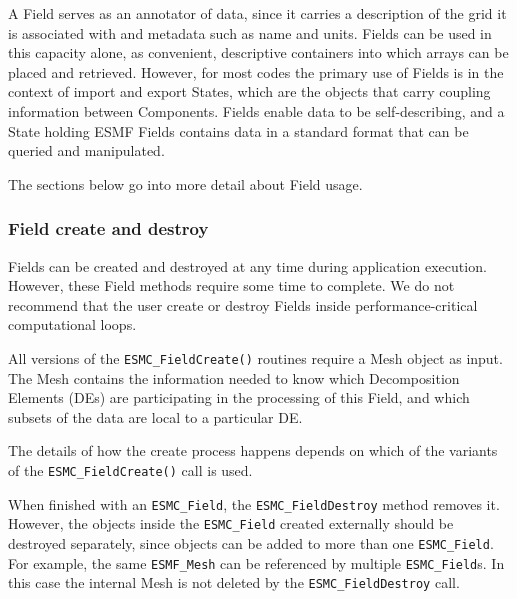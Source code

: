 


A Field serves as an annotator of data, since it carries 
a description of the grid it is associated with and metadata 
such as name and units.  Fields can be used in this capacity
alone, as convenient, descriptive containers into which arrays 
can be placed and retrieved.  However, for most codes the primary 
use of Fields is in the context of import and export States,
which are the objects that carry coupling information between 
Components.  Fields enable data to be self-describing, and a
State holding ESMF Fields contains data in a standard format
that can be queried and manipulated.  

The sections below go into more detail about Field usage.

\subsubsection{Field create and destroy}

Fields can be created and destroyed at any time during 
application execution.  However, these Field methods require 
some time to complete.  We do not recommend that the user
create or destroy Fields inside performance-critical 
computational loops.

All versions of the {\tt ESMC\_FieldCreate()} 
routines require a Mesh object as input.
The Mesh contains the information needed to know which 
Decomposition Elements (DEs) are participating in 
the processing of this Field, and which subsets of the data
are local to a particular DE.

The details of how the create process happens depends 
on which of the variants of the {\tt ESMC\_FieldCreate()} 
call is used.

When finished with an {\tt ESMC\_Field}, the {\tt ESMC\_FieldDestroy} method
removes it.  However, the objects inside the {\tt ESMC\_Field}
created externally should be destroyed separately, 
since objects can be added to
more than one {\tt ESMC\_Field}.  For example, the same {\tt ESMF\_Mesh}
can be referenced by multiple {\tt ESMC\_Field}s.  In this case the
internal Mesh is not deleted by the {\tt ESMC\_FieldDestroy} call.
